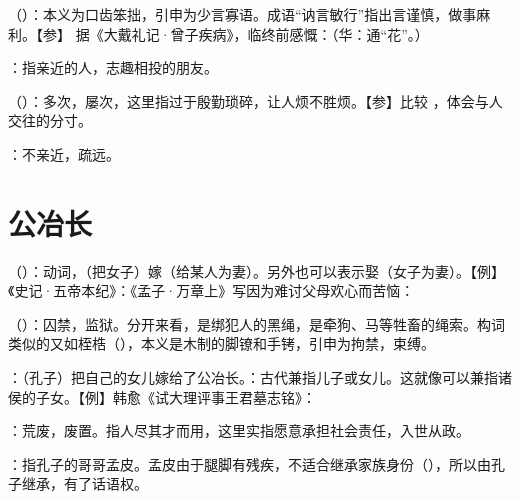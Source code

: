 {
\item {}（）：本义为口齿笨拙，引申为少言寡语。成语“讷言敏行”指出言谨慎，做事麻利。【参】 据《大戴礼记·曾子疾病》，临终前感慨：（华：通“花”。）
}
{}


{
\item {}：指亲近的人，志趣相投的朋友。
}
{}


{
\item {}（）：多次，屡次，这里指过于殷勤琐碎，让人烦不胜烦。【参】比较 ，体会与人交往的分寸。
\item {}：不亲近，疏远。
}
{}



\chapter{公冶长}

{
\item {}（）：动词，（把女子）嫁（给某人为妻）。另外也可以表示娶（女子为妻）。【例】《史记·五帝本纪》：《孟子·万章上》写因为难讨父母欢心而苦恼：
\item {}（）：囚禁，监狱。分开来看，是绑犯人的黑绳，是牵狗、马等牲畜的绳索。构词类似的又如桎梏（），本义是木制的脚镣和手铐，引申为拘禁，束缚。
\item {}：（孔子）把自己的女儿嫁给了公冶长。：古代兼指儿子或女儿。这就像可以兼指诸侯的子女。【例】韩愈《试大理评事王君墓志铭》：
}
{}


{
\item {}：荒废，废置。指人尽其才而用，这里实指愿意承担社会责任，入世从政。
\item {}：指孔子的哥哥孟皮。孟皮由于腿脚有残疾，不适合继承家族身份（），所以由孔子继承，有了话语权。%
}
{}  %


